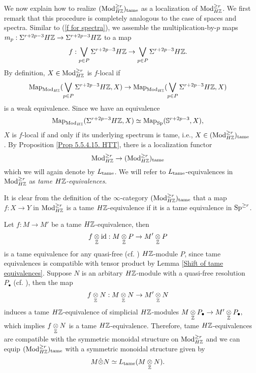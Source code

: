 \begin{construction}
We now explain how to realize $(\operatorname{Mod}^{\geq r}_{H{\mathbb{Z}}})_{\operatorname{\operatorname{tame}}}$ as a localization of 
$\operatorname{Mod}^{\geq r}_{H{\mathbb{Z}}}$. 
We first remark that this procedure is completely analogous to the case of spaces and spectra.
Similar to (\ref{f for spectra}), we assemble the multiplication-by-$p$ maps
$
m_p: \Sigma^{r+2p-3}H{\mathbb{Z}}
\to 
\Sigma^{r+2p-3}H{\mathbb{Z}}
$
to a map
\begin{equation}
	f: \bigvee_{p\in P}\Sigma^{r+2p-3} H{\mathbb{Z}} \to \bigvee_{p\in P}\Sigma^{r+2p-3} H{\mathbb{Z}}.
\end{equation}
By definition, $X\in \operatorname{Mod}^{\geq r}_{H{\mathbb{Z}}}$ is $f$-local if $$
\operatorname{Map}_{\operatorname{Mod}_{H{\mathbb{Z}}}}(\bigvee_{p\in P}\Sigma^{r+2p-3} H{\mathbb{Z}}, X) 
\to 
\operatorname{Map}_{\operatorname{Mod}_{H{\mathbb{Z}}}}(\bigvee_{p\in P}\Sigma^{r+2p-3} H{\mathbb{Z}}, X) 
$$
is a weak equivalence. 
Since we have an equivalence
$$
\operatorname{Map}_{\operatorname{Mod}_{H{\mathbb{Z}}}}(\Sigma^{r+2p-3} H{\mathbb{Z}}, X)
\simeq 
\operatorname{Map}_{\operatorname{Sp}}({\mathbb{S}}^{r+2p-3}, X),
$$
$X$ is $f$-local if and only if its underlying spectrum is tame, i.e., $X\in (\operatorname{Mod}^{\geq r}_{H{\mathbb{Z}}})_{\operatorname{\operatorname{tame}}}$. By Proposition \ref{Prop 5.5.4.15. HTT}, there is a localization functor 
$$
\operatorname{Mod}^{\geq r}_{H{\mathbb{Z}}} \to
(\operatorname{Mod}^{\geq r}_{H{\mathbb{Z}}})_{\operatorname{\operatorname{tame}}}
$$
which we will again denote by $L_{\operatorname{\operatorname{tame}}}$. We will refer to $L_{\operatorname{\operatorname{tame}}}$-equivalences in $\operatorname{Mod}^{\geq r}_{H{\mathbb{Z}}}$ as \emph{tame $H{\mathbb{Z}}$-equivalences}.

It is clear from the definition of the $\infty$-category $(\operatorname{Mod}^{\geq r}_{H{\mathbb{Z}}})_{\operatorname{\operatorname{tame}}}$ that a map $f:X \to Y$ in $\operatorname{Mod}^{\geq r}_{H{\mathbb{Z}}}$ is a tame $H{\mathbb{Z}}$-equivalence if it is a tame equivalence in $\operatorname{Sp}^{\geq r}$.

\begin{remark}
Let $f:M\to M'$ be a tame $H{\mathbb{Z}}$-equivalence, then 
$$
f\underset{{\mathbb{Z}}}{\otimes} \operatorname{id}:
M\underset{{\mathbb{Z}}}{\otimes} P \to M' \underset{{\mathbb{Z}}}{\otimes} P
$$
is a tame equivalence for any quasi-free (cf. \cite[Definition 7.2.1.16.]{HA}) $H{\mathbb{Z}}$-module $P$, since tame equivalences is compatible with tensor product by Lemma \ref{Shift of tame equivalences}.
Suppose $N$ is an arbitary $H{\mathbb{Z}}$-module with a quasi-free resolution $P_{\bullet}$ (cf. \cite[Remark 7.2.1.21.]{HA}), then the map
$$
f\underset{{\mathbb{Z}}}{\otimes} N: M\underset{{\mathbb{Z}}}{\otimes} N \to 
M'\underset{{\mathbb{Z}}}{\otimes} N
$$
induces a tame $H{\mathbb{Z}}$-equivalence of simplicial $H{\mathbb{Z}}$-modules
$
M \underset{{\mathbb{Z}}}{\otimes} P_{\bullet}
\to 
M' \underset{{\mathbb{Z}}}{\otimes} P_{\bullet},
$
which implies 
$
f\underset{{\mathbb{Z}}}{\otimes} N
$
is a tame $H{\mathbb{Z}}$-equivalence.
Therefore, tame $H{\mathbb{Z}}$-equivalences are compatible with the symmetric monoidal structure on $\operatorname{Mod}_{H{\mathbb{Z}}}^{\geq r}$ and we can equip $(\operatorname{Mod}^{\geq r}_{H{\mathbb{Z}}})_{\operatorname{\operatorname{tame}}}$ with a symmetric monoidal structure given by
$$
M\hat{\otimes} N \simeq L_{\operatorname{\operatorname{tame}}} (M\underset{{\mathbb{Z}}}{\otimes} N).
$$
\end{remark}


\end{construction}
